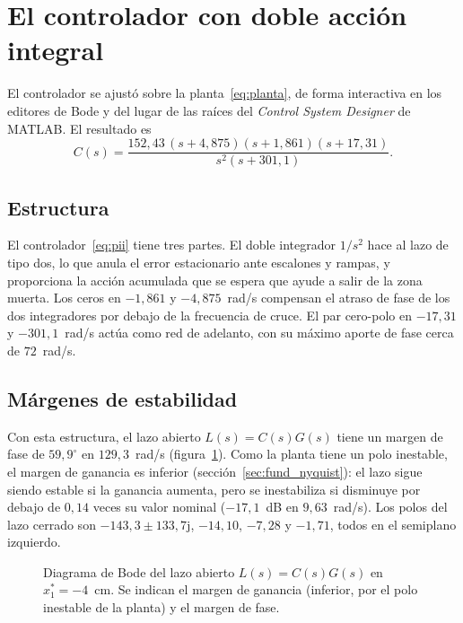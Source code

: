 \section{El controlador con doble acción integral}\label{sec:pii}

El controlador se ajustó sobre la planta~\eqref{eq:planta}, de forma interactiva en los editores de Bode y del lugar de las raíces del \emph{Control System Designer} de MATLAB. El resultado es
\begin{equation}
C(s)=\frac{152{,}43\,(s+4{,}875)(s+1{,}861)(s+17{,}31)}
{s^{2}(s+301{,}1)} .
\label{eq:pii}
\end{equation}

\subsection{Estructura}

El controlador~\eqref{eq:pii} tiene tres partes. El doble integrador $1/s^2$ hace al lazo de tipo dos, lo que anula el error estacionario ante escalones y rampas, y proporciona la acción acumulada que se espera que ayude a salir de la zona muerta. Los ceros en $-1{,}861$ y $-4{,}875$~rad/s compensan el atraso de fase de los dos integradores por debajo de la frecuencia de cruce. El par cero-polo en $-17{,}31$ y $-301{,}1$~rad/s actúa como red de adelanto, con su máximo aporte de fase cerca de $72$~rad/s.

\subsection{Márgenes de estabilidad}

Con esta estructura, el lazo abierto $L(s)=C(s)G(s)$ tiene un margen de fase de $59{,}9^\circ$ en $129{,}3$~rad/s (figura~\ref{bode_fase}). Como la planta tiene un polo inestable, el margen de ganancia es inferior (sección~\ref{sec:fund_nyquist}): el lazo sigue siendo estable si la ganancia aumenta, pero se inestabiliza si disminuye por debajo de $0{,}14$ veces su valor nominal ($-17{,}1$~dB en $9{,}63$~rad/s). Los polos del lazo cerrado son $-143{,}3\pm133{,}7\mathrm{j}$, $-14{,}10$, $-7{,}28$ y $-1{,}71$, todos en el semiplano izquierdo.

\begin{figure}[ht]
    \centering
    
    \caption[Diagrama de Bode]{Diagrama de Bode del lazo abierto $L(s)=C(s)G(s)$ en $x_1^*=-4$~cm. Se indican el margen de ganancia (inferior, por el polo inestable de la planta) y el margen de fase.}
    \label{bode_fase}
\end{figure}

